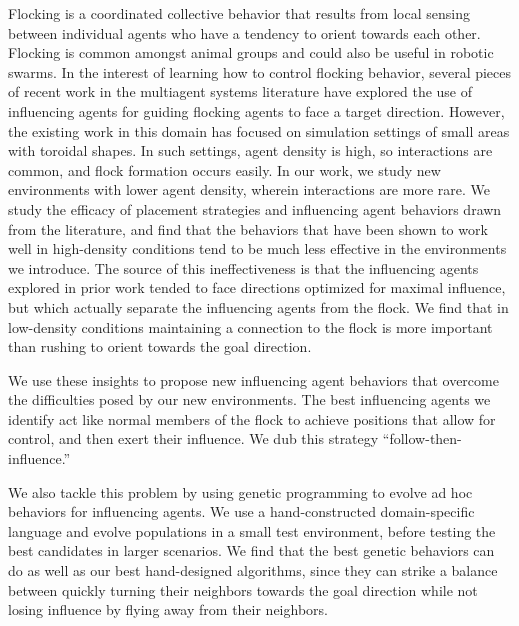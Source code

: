 
Flocking is a coordinated collective behavior that results from local sensing
between individual agents who have a tendency to orient towards each other.
Flocking is common amongst animal groups and could also be useful in robotic
swarms.
In the interest of learning how to control flocking behavior, several pieces
of recent work in the multiagent systems literature have explored the use of
influencing agents for guiding flocking agents to face a target direction.
However, the existing work in this domain has focused on simulation settings
of small areas with toroidal shapes.
In such settings, agent density is high, so interactions are common, and
flock formation occurs easily.
In our work, we study new environments with lower agent density, wherein
interactions are more rare.
We study the efficacy of placement strategies and influencing agent behaviors
drawn from the literature, and find that the behaviors that have been shown to
work well in high-density conditions tend to be much less effective in the
environments we introduce.
The source of this ineffectiveness is that the influencing agents explored in
prior work tended to face directions optimized for maximal influence, but which
actually separate the influencing agents from the flock.
We find that in low-density conditions maintaining a connection to the flock is
more important than rushing to orient towards the goal direction.

We use these insights to propose new influencing agent behaviors that overcome
the difficulties posed by our new environments.
The best influencing agents we identify act like normal members of the flock to
achieve positions that allow for control, and then exert their influence.  
We dub this strategy ``follow-then-influence.''

We also tackle this problem by using genetic programming to evolve ad hoc
behaviors for influencing agents.
We use a hand-constructed domain-specific language and evolve populations in
a small test environment, before testing the best candidates in larger
scenarios.
We find that the best genetic behaviors can do as well as our best
hand-designed algorithms, since they can strike a balance between quickly
turning their neighbors towards the goal direction while not losing influence
by flying away from their neighbors.
